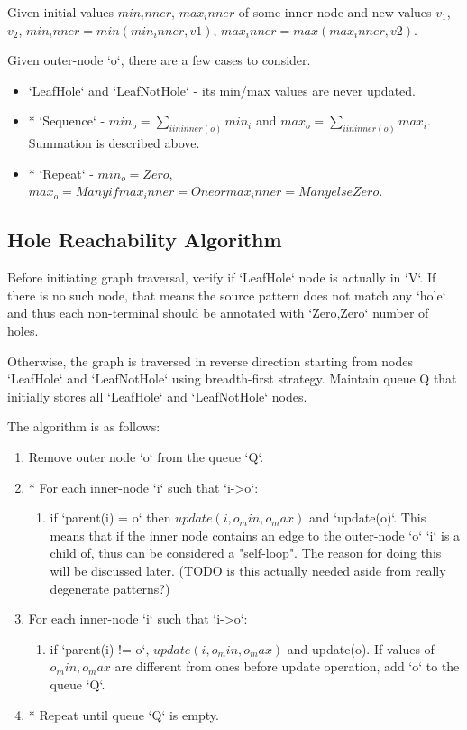 Given initial values $min_inner$, $max_inner$ of some inner-node  and new values $v_1$, $v_2$, $min_inner = min(min_inner, v1)$, $max_inner = max(max_inner, v2)$.


Given outer-node `o`, there are a few cases to consider.

\begin{itemize}
\item
`LeafHole` and `LeafNotHole` - its min/max values are never updated.
\item
* `Sequence` - $min_o = \sum_{i in inner(o)} min_i$ and $max_o = \sum_{i in inner(o)} max_i$. Summation is described above.
\item
* `Repeat` - $min_o = Zero$, $max_o = Many if max_inner = One or max_inner = Many else Zero$.
\end{itemize}

\subsection{Hole Reachability Algorithm}

Before initiating graph traversal, verify if `LeafHole` node is actually in `V`. If there is no such node, that means the source pattern does not match any `hole` and thus each non-terminal should be annotated with `Zero,Zero` number of holes.

Otherwise, the graph is traversed in reverse direction starting from nodes `LeafHole` and `LeafNotHole` using breadth-first strategy. Maintain queue Q that initially stores all `LeafHole` and `LeafNotHole` nodes.

The algorithm is as follows:
\begin{enumerate}
\item
Remove outer node `o` from the queue `Q`.
\item
* For each inner-node `i` such that `i->o`:
	\begin{enumerate}
	\item
	if `parent(i) = o` then $update(i, o_min, o_max)$ and `update(o)`. This means that if the inner node contains an edge to the outer-node `o` `i` is a child of, thus can be considered a "self-loop". The reason for doing this will be discussed later. (TODO is this actually needed aside from really degenerate patterns?)
	\end{enumerate}

\item
For each inner-node `i` such that `i->o`:
	\begin{enumerate}
	\item
	if `parent(i) != o`, $update(i, o_min, o_max)$ and update(o). If values of $o_min, o_max$ are different from ones before update operation, add `o` to the queue `Q`.
	\end{enumerate}

\item
* Repeat until queue `Q` is empty.

\end{enumerate}



